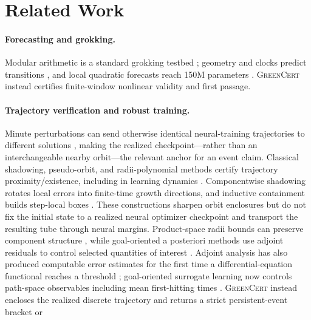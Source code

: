 \documentclass{article}
\newcommand{\method}{\textsc{GreenCert}}
\begin{document}
\section{Related Work}

\paragraph{Forecasting and grokking.}
Modular arithmetic is a standard grokking testbed
\citep{power2022grokking,gromov2023modular,mohamadi2024why}; geometry and clocks
predict transitions \citep{notsawo2023predicting,kim2026clock,khanh2026firstpassage},
and local quadratic forecasts reach 150M parameters \citep{meterez2026quadratic}.
\method{} instead certifies finite-window nonlinear validity and first passage.

\paragraph{Trajectory verification and robust training.}
Minute perturbations can send otherwise identical neural-training trajectories
to different solutions \citep{altintas2025butterfly}, making the realized
checkpoint---rather than an interchangeable nearby orbit---the relevant anchor
for an event claim.
Classical shadowing, pseudo-orbit, and radii-polynomial methods certify
trajectory proximity/existence, including in learning dynamics
\citep{chow1989shadowing,chow1992numerical,chow1994global,hammel1987numerical,sauer1991rigorous,lessard2014rigorous,bielecki2004shadowing,orvieto2019shadowing}.
Componentwise shadowing rotates local errors into finite-time growth directions,
and inductive containment builds step-local boxes
\citep{vanvleck2000componentwise,hayes2003containment}.  These constructions
sharpen orbit enclosures but do not fix the initial state to a realized neural
optimizer checkpoint and transport the resulting tube through neural margins.
Product-space radii bounds can preserve component structure
\citep{vandenberg2018wright}, while goal-oriented a posteriori methods use
adjoint residuals to control selected quantities of interest
\citep{becker2001optimal}.  Adjoint analysis has also produced computable error
estimates for the first time a differential-equation functional reaches a
threshold \citep{chaudhry2021threshold}; goal-oriented surrogate learning now
controls path-space observables including mean first-hitting times
\citep{zou2026goaloriented}.  \method{} instead encloses the
realized discrete trajectory and returns a strict persistent-event bracket or
\end{document}
